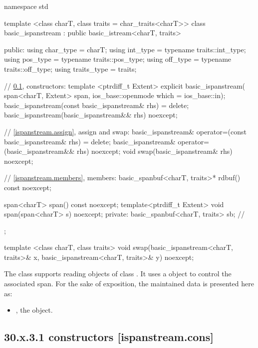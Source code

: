 \documentclass[ebook,11pt,article]{memoir}
\begin{document}
\begin{codeblock}
namespace std {
  template <class charT, class traits = char_traits<charT>>
  class basic_ispanstream
    : public basic_istream<charT, traits> {
  public:
    using char_type      = charT;
    using int_type       = typename traits::int_type;
    using pos_type       = typename traits::pos_type;
    using off_type       = typename traits::off_type;
    using traits_type    = traits;

    // \ref{ispanstream.cons}, constructors:
    template <ptrdiff_t Extent>
    explicit basic_ispanstream(
      span<charT, Extent> span,
      ios_base::openmode which = ios_base::in);
    basic_ispanstream(const basic_ispanstream& rhs) = delete;
    basic_ispanstream(basic_ispanstream&& rhs) noexcept;

    // \ref{ispanstream.assign}, assign and swap:
    basic_ispanstream& operator=(const basic_ispanstream& rhs) = delete;
    basic_ispanstream& operator=(basic_ispanstream&& rhs) noexcept;
    void swap(basic_ispanstream& rhs) noexcept;

    // \ref{ispanstream.members}, members:
    basic_spanbuf<charT, traits>* rdbuf() const noexcept;

    span<charT> span() const noexcept;
	template<ptrdiff_t Extent>
    void span(span<charT> s) noexcept;
  private:
    basic_spanbuf<charT, traits> sb; // \expos
  };

  template <class charT, class traits>
    void swap(basic_ispanstream<charT, traits>& x,
              basic_ispanstream<charT, traits>& y) noexcept;
}
\end{codeblock}

\pnum
The class
supports reading objects of class
.
It uses a
object to control the associated span.
For the sake of exposition, the maintained data is presented here as:
\begin{itemize}
\item
{}, the  object.
\end{itemize}

\subsection{30.x.3.1  constructors [ispanstream.cons]}
\label{ispanstream.cons}
\end{document}
